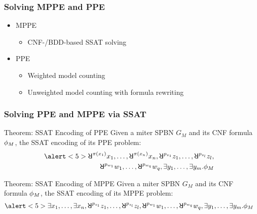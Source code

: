 \begin{frame}
  \frametitle{Solving MPPE and PPE}
  \begin{itemize}
    \item MPPE
          \pause
          \begin{itemize}
            \item CNF-/BDD-based SSAT solving
                  \pause
          \end{itemize}
    \item PPE
          \pause
          \begin{itemize}
            \item Weighted model counting
                  \pause
            \item Unweighted model counting with formula rewriting
          \end{itemize}
  \end{itemize}
\end{frame}

\begin{frame}
  \frametitle{Solving PPE and MPPE via SSAT}
  \begin{block}{Theorem: SSAT Encoding of PPE}
    Given a miter SPBN $G_M$ and its CNF formula $\phi_M$,
    the SSAT encoding of its PPE problem:
    \pause
    \begin{align*}
      \alert<5>{\random{\pi(x_1)}x_1,\ldots,\random{\pi(x_n)}x_n},
      \random{p_{z_1}}z_1,\ldots,\random{p_{z_l}}z_l, \\
      \random{p_{w_1}}w_1,\ldots,\random{p_{w_q}}w_q,
      \exists y_1,\ldots,\exists y_m.
      \pf_M
    \end{align*}
  \end{block}
  \pause
  \begin{block}{Theorem: SSAT Encoding of MPPE}
    Given a miter SPBN $G_M$ and its CNF formula $\phi_M$,
    the SSAT encoding of its MPPE problem:
    \pause
    \begin{align*}
      \alert<5>{\exists x_1,\ldots,\exists x_n},
      \random{p_{z_1}}z_1,\ldots,\random{p_{z_l}}z_l,
      \random{p_{w_1}}w_1,\ldots,\random{p_{w_q}}w_q,
      \exists y_1,\ldots,\exists y_m.
      \pf_M
    \end{align*}
  \end{block}
\end{frame}

